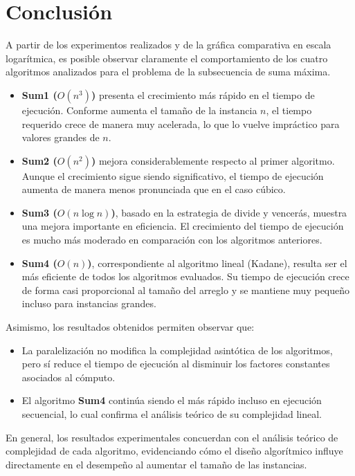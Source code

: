 \section{Conclusión}

A partir de los experimentos realizados y de la gráfica comparativa en escala logarítmica, es posible observar claramente el comportamiento de los cuatro algoritmos analizados para el problema de la subsecuencia de suma máxima.

\begin{itemize}

\item \textbf{Sum1 ($O(n^3)$)} presenta el crecimiento más rápido en el tiempo de ejecución. Conforme aumenta el tamaño de la instancia $n$, el tiempo requerido crece de manera muy acelerada, lo que lo vuelve impráctico para valores grandes de $n$.

\item \textbf{Sum2 ($O(n^2)$)} mejora considerablemente respecto al primer algoritmo. Aunque el crecimiento sigue siendo significativo, el tiempo de ejecución aumenta de manera menos pronunciada que en el caso cúbico.

\item \textbf{Sum3 ($O(n \log n)$)}, basado en la estrategia de divide y vencerás, muestra una mejora importante en eficiencia. El crecimiento del tiempo de ejecución es mucho más moderado en comparación con los algoritmos anteriores.

\item \textbf{Sum4 ($O(n)$)}, correspondiente al algoritmo lineal (Kadane), resulta ser el más eficiente de todos los algoritmos evaluados. Su tiempo de ejecución crece de forma casi proporcional al tamaño del arreglo y se mantiene muy pequeño incluso para instancias grandes.

\end{itemize}

Asimismo, los resultados obtenidos permiten observar que:

\begin{itemize}

\item La paralelización no modifica la complejidad asintótica de los algoritmos, pero sí reduce el tiempo de ejecución al disminuir los factores constantes asociados al cómputo.

\item El algoritmo \textbf{Sum4} continúa siendo el más rápido incluso en ejecución secuencial, lo cual confirma el análisis teórico de su complejidad lineal.

\end{itemize}

En general, los resultados experimentales concuerdan con el análisis teórico de complejidad de cada algoritmo, evidenciando cómo el diseño algorítmico influye directamente en el desempeño al aumentar el tamaño de las instancias.